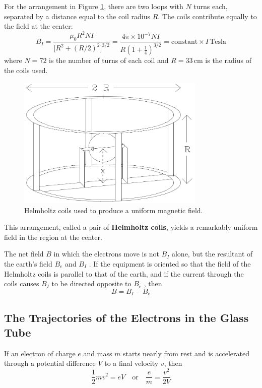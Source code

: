 For the arrangement in Figure {\ref{fig:coils}}, there are two loops with $N$ turns each, separated by a distance equal to the coil radius $R$. The coils contribute equally to the field at the center:
\begin{equation}
  B_{I}=\frac{\mu_{0}R^2NI}{\big[R^2+(R/2)^2\big]^{3/2}}=\frac{4\pi\times 10^{-7}NI}{R(1+\frac{1}{4})^{3/2}}=\mathrm{constant}\times I\, \mathrm{Tesla}
\end{equation}
where $N = 72$ is the number of turns of each coil and $R = 33\, \mathrm{cm}$ is the radius of the coils used.\myskip
\begin{figure}[h]
\centering
\includegraphics[width=0.8\textwidth]{./Exp6/pic/image2.png}
\caption{Helmholtz coils used to produce a uniform magnetic field.}
\label{fig:coils}
\end{figure} 

This arrangement, called a pair of \textbf{Helmholtz coils}, yields a remarkably uniform field in the region at the center.\myskip

The net field $B$ in which the electrons move is not $B_I$ alone, but the resultant of the earth's field $B_e$ and $B_I$ . If the equipment is oriented so that the field of the Helmholtz coils is parallel to that of the earth, and if the current through the coils causes $B_I$ to be directed opposite to $B_e$ , then
\begin{equation}
  B=B_{I}-B_{e}
\label{eq:b}
\end{equation}

\subsection{The Trajectories of the Electrons in the Glass Tube}
If an electron of charge $e$ and mass $m$ starts nearly from rest and is accelerated through a potential difference $V$ to a final velocity $v$, then
\begin{equation}
  \frac{1}{2}mv^2=eV\quad \mathrm{or}\quad \frac{e}{m}=\frac{v^2}{2V}
\label{eq:ev}
\end{equation}

